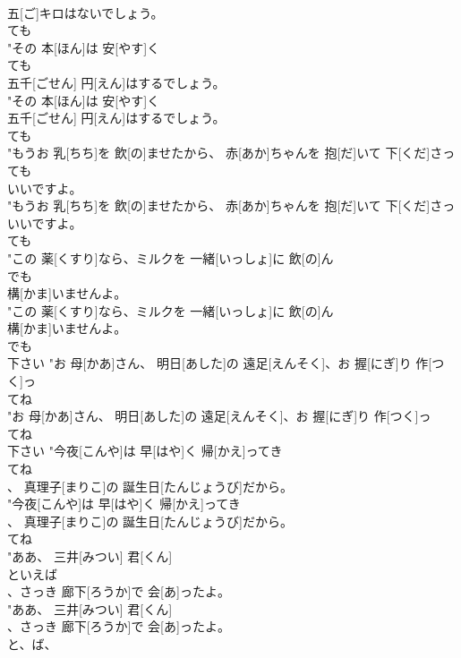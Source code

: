 \documentclass[8pt]{extreport}
\begin{document}
\begin{CJK}{UTF8}{min}
\\	五[ご]キロはないでしょう。
\\	ても
\\	"その 本[ほん]は 安[やす]く
\\	ても
\\	五千[ごせん] 円[えん]はするでしょう。
\\	"その 本[ほん]は 安[やす]く
\\	五千[ごせん] 円[えん]はするでしょう。
\\	ても
\\	"もうお 乳[ちち]を 飲[の]ませたから、 赤[あか]ちゃんを 抱[だ]いて 下[くだ]さっ
\\	ても
\\	いいですよ。
\\	"もうお 乳[ちち]を 飲[の]ませたから、 赤[あか]ちゃんを 抱[だ]いて 下[くだ]さっ
\\	いいですよ。
\\	ても
\\	"この 薬[くすり]なら、ミルクを 一緒[いっしょ]に 飲[の]ん
\\	でも
\\	構[かま]いませんよ。
\\	"この 薬[くすり]なら、ミルクを 一緒[いっしょ]に 飲[の]ん
\\	構[かま]いませんよ。
\\	でも
\\	下さい	"お 母[かあ]さん、 明日[あした]の 遠足[えんそく]、お 握[にぎ]り 作[つく]っ
\\	てね
\\	"お 母[かあ]さん、 明日[あした]の 遠足[えんそく]、お 握[にぎ]り 作[つく]っ
\\	てね
\\	下さい	"今夜[こんや]は 早[はや]く 帰[かえ]ってき
\\	てね
\\	、 真理子[まりこ]の 誕生日[たんじょうび]だから。
\\	"今夜[こんや]は 早[はや]く 帰[かえ]ってき
\\	、 真理子[まりこ]の 誕生日[たんじょうび]だから。
\\	てね
\\	"ああ、 三井[みつい] 君[くん]
\\	といえば
\\	、さっき 廊下[ろうか]で 会[あ]ったよ。
\\	"ああ、 三井[みつい] 君[くん]
\\	、さっき 廊下[ろうか]で 会[あ]ったよ。
\\	と、ば、

\end{CJK}
\end{document}
